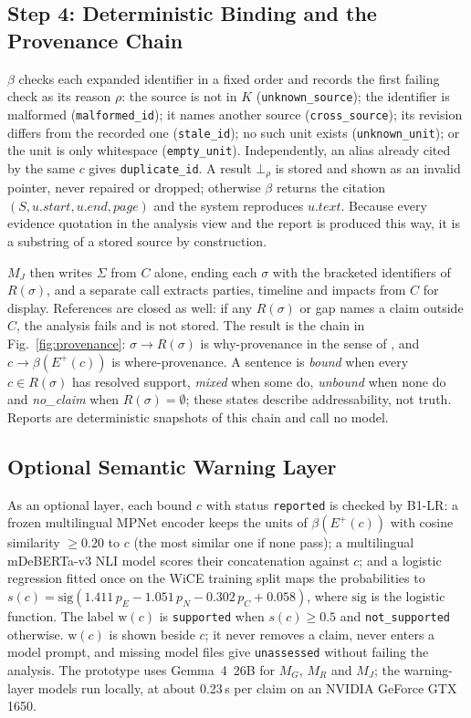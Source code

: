 \documentclass[runningheads]{llncs}
\begin{document}
\subsection{Step 4: Deterministic Binding and the Provenance Chain}\label{sec:binding}
$\beta$ checks each expanded identifier in a fixed order and records the first failing check as its
reason $\rho$: the source is not in $K$ (\texttt{unknown\_source}); the identifier is malformed
(\texttt{malformed\_id}); it names another source (\texttt{cross\_source}); its revision differs from
the recorded one (\texttt{stale\_id}); no such unit exists (\texttt{unknown\_unit}); or the unit is only
whitespace (\texttt{empty\_unit}). Independently, an alias already cited by the same $c$ gives
\texttt{duplicate\_id}. A result $\bot_\rho$ is stored and shown as an invalid pointer, never repaired or
dropped; otherwise $\beta$ returns the citation $(S,u.\mathit{start},u.\mathit{end},\mathit{page})$
and the system reproduces $u.\mathit{text}$. Because every evidence quotation in the analysis view
and the report is produced this way, it is a substring of a stored source by construction.

$M_J$ then writes $\Sigma$ from $C$ alone, ending each $\sigma$ with the bracketed identifiers of
$R(\sigma)$, and a separate call extracts parties, timeline and impacts from $C$ for display.
References are closed as well: if any $R(\sigma)$ or gap names a claim outside $C$, the analysis
fails and is not stored. The result is the chain in Fig.~\ref{fig:provenance}: $\sigma\to R(\sigma)$ is
why-provenance in the sense of \cite{buneman2001provenance}, and $c\to\beta(E^{+}(c))$ is
where-provenance. A sentence is \emph{bound} when every $c\in R(\sigma)$ has resolved support,
\emph{mixed} when some do, \emph{unbound} when none do and \emph{no\_claim} when $R(\sigma)=\emptyset$;
these states describe addressability, not truth. Reports are deterministic snapshots of this chain and
call no model.

\subsection{Optional Semantic Warning Layer}\label{sec:warning}\label{sec:check}
As an optional layer, each bound $c$ with status \texttt{reported} is checked by B1-LR: a
frozen multilingual MPNet encoder \cite{reimers2020multilingual} keeps the units of $\beta(E^{+}(c))$ with
cosine similarity $\ge 0.20$ to $c$ (the most similar one if none pass); a multilingual mDeBERTa-v3 NLI
model \cite{he2021debertav3,laurer2022mdeberta} scores their concatenation against $c$; and a logistic
regression fitted once on the WiCE training split \cite{kamoi2023wice} maps the probabilities to
$s(c)=\mathrm{sig}(1.411\,p_E-1.051\,p_N-0.302\,p_C+0.058)$, where $\mathrm{sig}$ is the logistic function. The label $\mathrm{w}(c)$ is \texttt{supported} when
$s(c)\ge 0.5$ and \texttt{not\_supported} otherwise. $\mathrm{w}(c)$ is shown beside $c$; it never removes
a claim, never enters a model prompt, and missing model files give \texttt{unassessed} without failing
the analysis. The prototype uses Gemma~4~26B for $M_G$, $M_R$ and $M_J$; the warning-layer models run
locally, at about 0.23\,s per claim on an NVIDIA GeForce GTX 1650.
\end{document}
